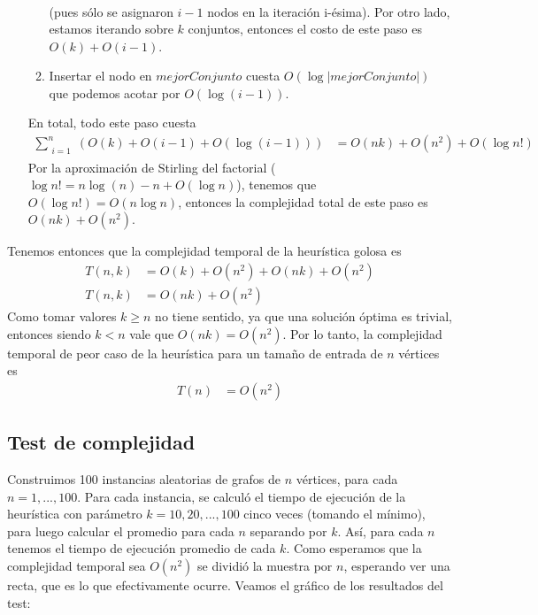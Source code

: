 \begin{enumerate}
\begin{enumerate}
\begin{align*}
            \end{align*}
            (pues sólo se asignaron $i - 1$ nodos en la iteración i-ésima). Por otro lado, estamos iterando sobre $k$ conjuntos, entonces el costo de este paso es $O(k) + O(i - 1)$.
            \item Insertar el nodo en $mejorConjunto$ cuesta $O(\log |mejorConjunto|)$ que podemos acotar por $O(\log (i - 1))$.
        \end{enumerate}
        En total, todo este paso cuesta
        \begin{align*}
                \sum\limits_{\substack{i = 1}}^n (O(k) + O(i-1) + O(\log (i - 1))) &= O(nk) + O(n^2) + O(\log n!)
        \end{align*}
        Por la aproximación de Stirling del factorial ($\log n! = n \log(n) - n + O(\log n)$), tenemos que $O(\log n!) = O(n \log n)$, entonces la complejidad total de este paso es $O(nk) + O(n^2)$.
\end{enumerate}
Tenemos entonces que la complejidad temporal de la heurística golosa es
\begin{align*}
    T(n,k) &= O(k) + O(n^2) + O(nk) + O(n^2) \\
    T(n,k) &= O(nk) + O(n^2)
\end{align*}
Como tomar valores $k \geq n$ no tiene sentido, ya que una solución óptima es trivial, entonces siendo $k < n$ vale que $O(nk) = O(n^2)$. Por lo tanto, la complejidad temporal de peor caso de la heurística para un tamaño de entrada de $n$ vértices es
\begin{align*}
    T(n) &= O(n^2)
\end{align*}

\subsection{Test de complejidad}

Construimos 100 instancias aleatorias de grafos de $n$ vértices, para cada $n = {1, ... , 100}$. Para cada instancia, se calculó el tiempo de ejecución de la heurística con parámetro $k = {10, 20, ..., 100}$ cinco veces (tomando el mínimo), para luego calcular el promedio para cada $n$ separando por $k$. Así, para cada $n$ tenemos el tiempo de ejecución promedio de cada $k$. Como esperamos que la complejidad temporal sea $O(n^2)$ se dividió la muestra por $n$, esperando ver una recta, que es lo que efectivamente ocurre. Veamos el gráfico de los resultados del test:


